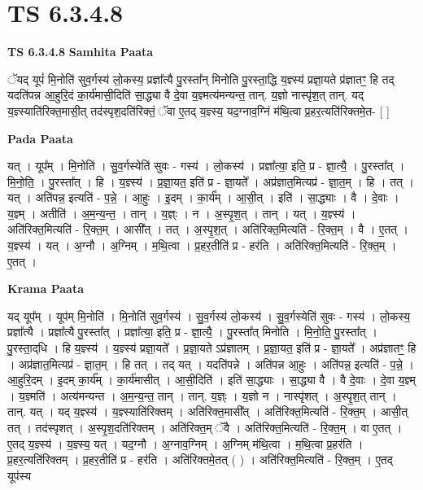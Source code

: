 \documentclass[17pt]{extarticle}
\begin{document}
\section{ TS 6.3.4.8 }

\textbf{TS 6.3.4.8 } \newline
\textbf{Samhita Paata} \newline

ॅयद् यूपं॑ मि॒नोति॑ सुव॒र्गस्य॑ लो॒कस्य॒ प्रज्ञा᳚त्यै पु॒रस्ता᳚न् मिनोति पु॒रस्ता॒द्धि य॒ज्ञ्स्य॑ प्रज्ञा॒यते प्र॑ज्ञातꣳ॒॒ हि तद् यदति॑पन्न आ॒हुरि॒दं का॒र्य॑मासी॒दिति॑ सा॒द्ध्या वै दे॒वा य॒ज्ञ्मत्य॑मन्यन्त॒ तान्. य॒ज्ञो नास्पृ॑श॒त् तान्. यद् य॒ज्ञ्स्याति॑रिक्त॒मासी॒त् तद॑स्पृश॒दति॑रिक्तं॒ ॅवा ए॒तद् य॒ज्ञ्स्य॒ यद॒ग्नाव॒ग्निं म॑थि॒त्वा प्र॒हर॒त्यति॑रिक्तमे॒त- [  ] \newline

\textbf{Pada Paata} \newline

यत् । यूप᳚म् । मि॒नोति॑ । सु॒व॒र्गस्येति॑ सुवः - गस्य॑ । लो॒कस्य॑ । प्रज्ञा᳚त्या॒ इति॒ प्र - ज्ञा॒त्यै॒ । पु॒रस्ता᳚त् । मि॒नो॒ति॒ । पु॒रस्ता᳚त् । हि । य॒ज्ञ्स्य॑ । प्र॒ज्ञा॒यत॒ इति॑ प्र - ज्ञा॒यते᳚ । अप्र॑ज्ञात॒मित्यप्र॑ - ज्ञा॒त॒म् । हि । तत् । यत् । अति॑पन्न॒ इत्यति॑ - प॒न्ने॒ । आ॒हुः । इ॒दम् । का॒र्य᳚म् । आ॒सी॒त् । इति॑ । सा॒द्ध्याः । वै । दे॒वाः । य॒ज्ञ्म् । अतीति॑ । अ॒म॒न्य॒न्त॒ । तान् । य॒ज्ञ्ः । न । अ॒स्पृ॒श॒त् । तान् । यत् । य॒ज्ञ्स्य॑ । अति॑रिक्त॒मित्यति॑ - रि॒क्त॒म् । आसी᳚त् । तत् । अ॒स्पृ॒श॒त् । अति॑रिक्त॒मित्यति॑ - रि॒क्त॒म् । वै । ए॒तत् । य॒ज्ञ्स्य॑ । यत् । अ॒ग्नौ । अ॒ग्निम् । म॒थि॒त्वा । प्र॒हर॒तीति॑ प्र - हर॑ति । अति॑रिक्त॒मित्यति॑ - रि॒क्त॒म् । ए॒तत् ।  \newline


\textbf{Krama Paata} \newline

यद् यूप᳚म् । यूप॑म् मि॒नोति॑ । मि॒नोति॑ सुव॒र्गस्य॑ । सु॒व॒र्गस्य॑ लो॒कस्य॑ । सु॒व॒र्गस्येति॑ सुवः - गस्य॑ । लो॒कस्य॒ प्रज्ञा᳚त्यै । प्रज्ञा᳚त्यै पु॒रस्ता᳚त् । प्रज्ञा᳚त्या॒ इति॒ प्र - ज्ञा॒त्यै॒ । पु॒रस्ता᳚त् मिनोति । मि॒नो॒ति॒ पु॒रस्ता᳚त् । पु॒रस्ता॒द्‌धि । हि य॒ज्ञ्स्य॑ । य॒ज्ञ्स्य॑ प्रज्ञा॒यते᳚ । प्र॒ज्ञा॒यते ऽप्र॑ज्ञातम् । प्र॒ज्ञा॒यत॒ इति॑ प्र - ज्ञा॒यते᳚ । अप्र॑ज्ञातꣳ॒॒ हि । अप्र॑ज्ञात॒मित्यप्र॑ - ज्ञा॒त॒म् । हि तत् । तद् यत् । यदति॑पन्ने । अति॑पन्न आ॒हुः । अति॑पन्न॒ इत्यति॑ - प॒न्ने॒ । आ॒हुरि॒दम् । इ॒दम् का॒र्य᳚म् । का॒र्य॑मासीत् । आ॒सी॒दिति॑ । इति॑ सा॒द्ध्याः । सा॒द्ध्या वै । वै दे॒वाः । दे॒वा य॒ज्ञ्म् । य॒ज्ञ्मति॑ । अत्य॑मन्यन्त । अ॒म॒न्य॒न्त॒ तान् । तान्. य॒ज्ञ्ः । य॒ज्ञो न । नास्पृ॑शत् । अ॒स्पृ॒श॒त् तान् । तान्. यत् । यद् य॒ज्ञ्स्य॑ । य॒ज्ञ्स्याति॑रिक्तम् । अति॑रिक्त॒मासी᳚त् । अति॑रिक्त॒मित्यति॑ - रि॒क्त॒म् । आसी॒त् तत् । तद॑स्पृशत् । अ॒स्पृ॒श॒दति॑रिक्तम् । अति॑रिक्त॒म् ॅवै । अति॑रिक्त॒मित्यति॑ - रि॒क्त॒म् । वा ए॒तत् । ए॒तद् य॒ज्ञ्स्य॑ । य॒ज्ञ्स्य॒ यत् । यद॒ग्नौ । अ॒ग्नाव॒ग्निम् । अ॒ग्निम् म॑थि॒त्वा । म॒थि॒त्वा प्र॒हर॑ति । प्र॒हर॒त्यति॑रिक्तम् । प्र॒हर॒तीति॑ प्र - हर॑ति । अति॑रिक्तमे॒तत् ( ) । अति॑रिक्त॒मित्यति॑ - रि॒क्त॒म् । ए॒तद् यूप॑स्य \newline
\end{document}
